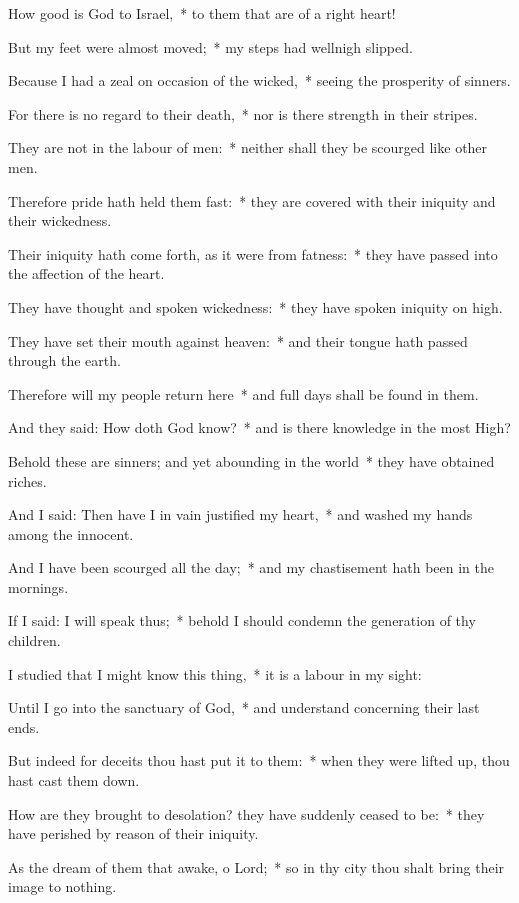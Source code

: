 \begin{enpars}
\item How good is God to Israel,~* to them that are of a right heart!
\item But my feet were almost moved;~* my steps had wellnigh slipped.
\item Because I had a zeal on occasion of the wicked,~* seeing the prosperity of sinners.
\item For there is no regard to their death,~* nor is there strength in their stripes.
\item They are not in the labour of men:~* neither shall they be scourged like other men.
\item Therefore pride hath held them fast:~* they are covered with their iniquity and their wickedness.
\item Their iniquity hath come forth, as it were from fatness:~* they have passed into the affection of the heart.
\item They have thought and spoken wickedness:~* they have spoken iniquity on high.
\item They have set their mouth against heaven:~* and their tongue hath passed through the earth.
\item Therefore will my people return here~* and full days shall be found in them.
\item And they said: How doth God know?~* and is there knowledge in the most High?
\item Behold these are sinners; and yet abounding in the world~* they have obtained riches.
\item And I said: Then have I in vain justified my heart,~* and washed my hands among the innocent.
\item And I have been scourged all the day;~* and my chastisement hath been in the mornings.
\item If I said: I will speak thus;~* behold I should condemn the generation of thy children.
\item I studied that I might know this thing,~* it is a labour in my sight:
\item Until I go into the sanctuary of God,~* and understand concerning their last ends.
\item But indeed for deceits thou hast put it to them:~* when they were lifted up, thou hast cast them down.
\item How are they brought to desolation? they have suddenly ceased to be:~* they have perished by reason of their iniquity.
\item As the dream of them that awake, o Lord;~* so in thy city thou shalt bring their image to nothing.

\end{enpars}
